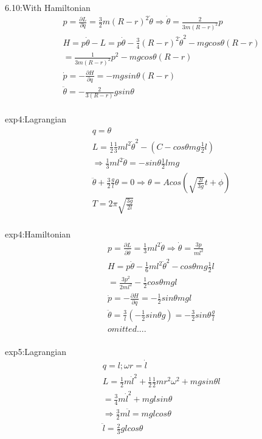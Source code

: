 \documentclass{article}
\begin{document}
6.10:With Hamiltonian
\begin{align*}
&p=\frac{ \partial L}{ \partial \dot q}=\frac32m(R-r)^2\dot \theta\Rightarrow \dot\theta=\frac{2}{3m(R-r)^2}p \\
&H=p\dot \theta -L=p\dot\theta-\frac34(R-r)^2\dot\theta^2-mgcos\theta(R-r) \\
&=\frac{1}{3m(R-r)^2}p^2-mgcos\theta(R-r) \\
&\dot p=-\frac{ \partial H}{ \partial q}=-mgsin\theta(R-r) \\
&\ddot\theta=-\frac2{3(R-r)}gsin\theta  \\
\end{align*}

exp4:Lagrangian
\begin{align*}
&q=\theta \\
&L=\frac12\frac13ml^2\dot \theta^2-(C-cos\theta mg\frac12l) \\
&\Rightarrow \frac13ml^2\ddot\theta =-sin\theta \frac12lmg \\
&\ddot\theta+\frac32\frac{g}{l}\theta=0\Rightarrow \theta=Acos(\sqrt{\frac{2l}{3g}}t+\phi) \\
&T=2\pi\sqrt{\frac{3g}{2l}} \\
\end{align*}

exp4:Hamiltonian
\begin{align*}
&p=\frac{ \partial L}{ \partial \dot\theta}=\frac13ml^2\dot\theta\Rightarrow \dot\theta=\frac{3p}{ml^2} \\
&H=p\dot\theta -\frac16ml^2\dot\theta^2-cos\theta mg\frac12l \\
& =\frac{3p^2}{2ml^2}-\frac12cos\theta mgl \\
& \dot p=-\frac{ \partial H}{ \partial q}=-\frac12sin\theta mgl \\
&\ddot\theta=\frac{3}{l}(-\frac12sin\theta g)=-\frac32sin\theta\frac gl \\
&omitted .... \\
\end{align*}

exp5:Lagrangian
\begin{align*}
&q=l;\omega r=\dot l \\
&L=\frac12m\dot l^2+\frac12\frac12mr^2 \omega^2+mgsin\theta l \\
&=\frac34m\dot l^2+mglsin\theta  \\
&\Rightarrow \frac32 m\ddot l=mglcos\theta \\
&\ddot l=\frac23glcos\theta \\
\end{align*}
\end{document}
